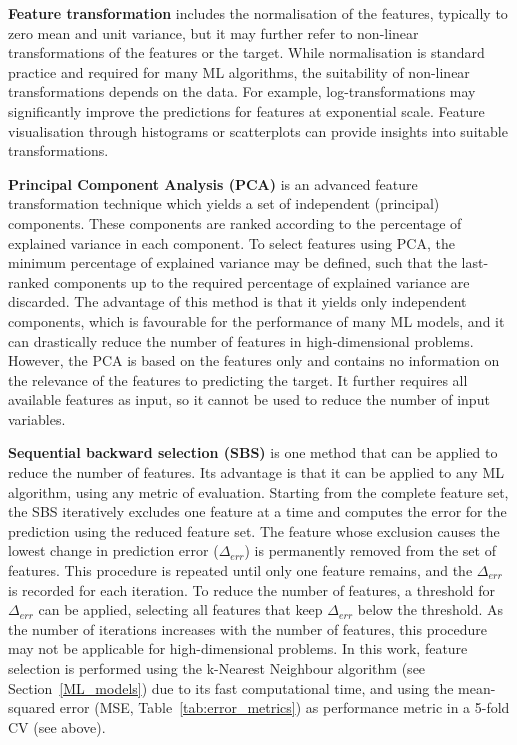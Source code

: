 \textbf{Feature transformation} includes the normalisation of the features, typically to zero mean and unit variance, but it may further refer to non-linear transformations of the features or the target. While normalisation is standard practice and required for many ML algorithms, the suitability of non-linear transformations depends on the data. For example, log-transformations may significantly improve the predictions for features at exponential scale. Feature visualisation through histograms or scatterplots can provide insights into suitable transformations.

\textbf{Principal Component Analysis (PCA)} \cite{tipping_probabilistic_1999} is an advanced feature transformation technique which yields a set of independent (principal) components. These components are ranked according to the percentage of explained variance in each component. To select features using PCA, the minimum percentage of explained variance may be defined, such that the last-ranked components up to the required percentage of explained variance are discarded. 
The advantage of this method is that it yields only independent components, which is favourable for the performance of many ML models, and it can drastically reduce the number of features in high-dimensional problems. However, the PCA is based on the features only and contains no information on the relevance of the features to predicting the target. It further requires all available features as input, so it cannot be used to reduce the number of input variables.

\textbf{Sequential backward selection (SBS) }\cite{ferri_comparative_1994} is one method that can be applied to reduce the number of features. Its advantage is that it can be applied to any ML algorithm, using any metric of evaluation. 
Starting from the complete feature set, the SBS iteratively excludes one feature at a time and computes the error for the prediction using the reduced feature set. The feature whose exclusion causes the lowest change in prediction error ($\Delta_{err}$) is permanently removed from the set of features. This procedure is repeated until only one feature remains, and the $\Delta_{err}$ is recorded for each iteration.
To reduce the number of features, a threshold for $\Delta_{err}$ can be applied, selecting all features that keep $\Delta_{err}$ below the threshold.
As the number of iterations increases with the number of features, this procedure may not be applicable for high-dimensional problems.
%
In this work, feature selection is performed using the k-Nearest Neighbour algorithm (see Section~\ref{ML_models}) due to its fast computational time, and using the mean-squared error (MSE, Table~\ref{tab:error_metrics}) as performance metric in a 5-fold CV (see above).

